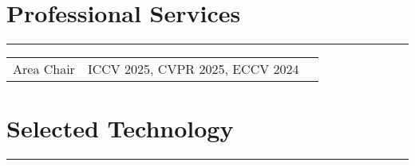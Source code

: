 \documentclass[10pt]{article}
\begin{document}
\vspace*{-0.8cm}

\section*{Professional Services}
\vspace{-0.3cm}
{\color{E6E6E6} \hrule height 0.04cm}
\vspace{0.4cm}
\renewcommand{\arraystretch}{1.0}
\begin{tabular}{C Z >{\setlength{\baselineskip}{0.9\baselineskip}}D}
	{
		Area Chair
	}
	&
	{
		{ICCV 2025, CVPR 2025, ECCV 2024}
	}
	\\
\end{tabular}

\section*{Selected Technology}
\vspace{-0.3cm}
{\color{E6E6E6} \hrule height 0.04cm}
\vspace{0.4cm}
\renewcommand{\arraystretch}{1.0}
\end{document}
